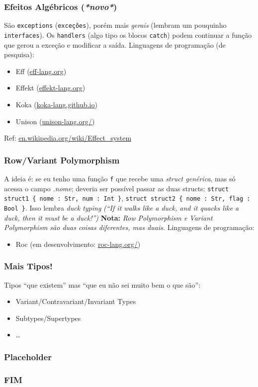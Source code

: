 \documentclass{beamer}
\newcommand{\inlcode}[1]{\texttt{#1}}
\newcommand{\nota}[1]{\textbf{Nota:}\textit{ #1}}
\begin{document}
\begin{frame}
    \frametitle{Efeitos Algébricos (\emph{*novo*})}
    São \texttt{exceptions} (\texttt{exceções}),
    porém mais \emph{gerais}
    (lembram um pouquinho \texttt{interfaces}).
    \vfill
    Os \texttt{handlers} (algo tipo os blocos \texttt{catch})
    podem continuar a função que gerou a exceção e
    modificar a saída.
    \vfill
    Linguagens de programação (de pesquisa):
    \begin{itemize}
        \item Eff (\url{eff-lang.org})
        \item Effekt (\url{effekt-lang.org})
        \item Koka (\url{koka-lang.github.io})
        \item Unison (\url{unison-lang.org/})
    \end{itemize}
    \vfill
    Ref: \url{en.wikipedia.org/wiki/Effect_system}
\end{frame}

\begin{frame}
    \frametitle{Row/Variant Polymorphism}
    A ideia é: se eu tenho uma função \inlcode{f}
    que recebe uma \emph{struct genérica},
    mas só acessa o campo \emph{.nome};
    deveria ser possível passar as duas structs:
    \inlcode{struct struct1 \{ nome : Str, num : Int \}},
    \inlcode{struct struct2 \{ nome : Str, flag : Bool \}}.
    \vfill
    Isso lembra \emph{duck typing}
    \textit{(``If it walks like a duck,
    and it quacks like a duck,
    then it must be a duck!'')}
    \vfill
    \nota{Row Polymorphism e Variant Polymorphism são duas
    coisas diferentes, mas duais.}
    \vfill
    Linguagens de programação:
    \begin{itemize}
        \item Roc (em desenvolvimento: \url{roc-lang.org/})
    \end{itemize}
\end{frame}

\begin{frame}
    \frametitle{Mais Tipos!}
    Tipos ``que existem'' mas ``que eu não sei muito bem o que são'':
    \begin{itemize}
        \item Variant/Contravariant/Invariant Types
        \item Subtypes/Supertypes
        \item \dots
    \end{itemize}
\end{frame}

\begin{frame}
    \frametitle{Placeholder}
\end{frame}

\begin{frame}
    \frametitle{FIM}
\end{frame}
\end{document}
